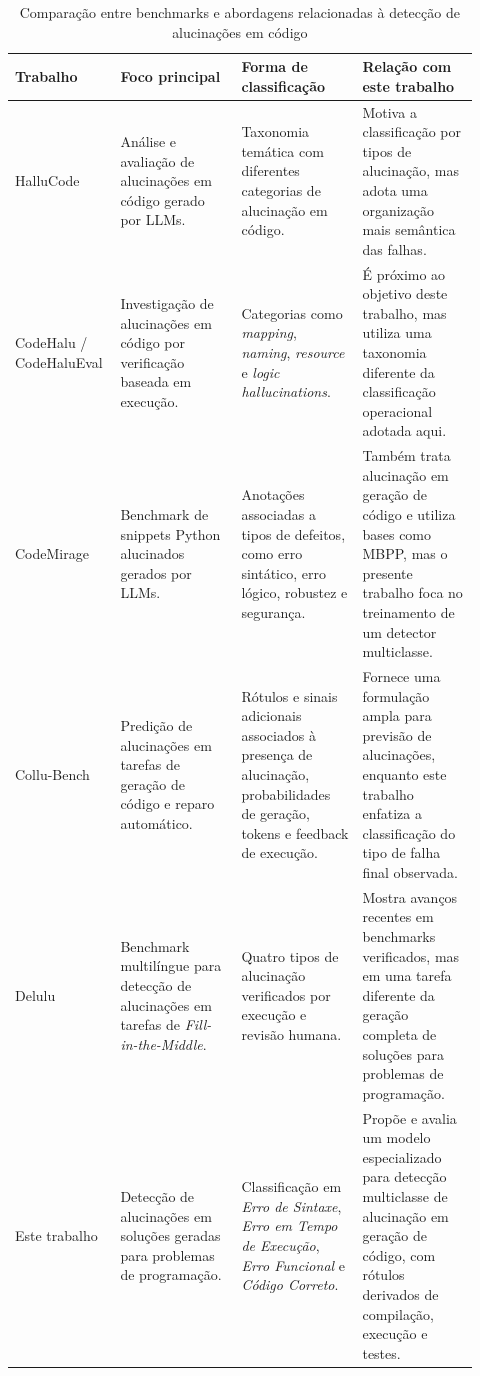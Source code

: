 \documentclass[conference]{IEEEtran}
\begin{document}
\begin{table}[!htbp]
\centering
\caption{Comparação entre benchmarks e abordagens relacionadas à detecção de alucinações em código}
\label{tab:benchmarks-relacionados}

\small
\begin{tabular}{p{0.18\linewidth} p{0.25\linewidth} p{0.25\linewidth} p{0.24\linewidth}}
\toprule
\textbf{Trabalho} & \textbf{Foco principal} & \textbf{Forma de classificação} & \textbf{Relação com este trabalho} \\
\midrule

HalluCode \cite{2404.00971} &
Análise e avaliação de alucinações em código gerado por LLMs. &
Taxonomia temática com diferentes categorias de alucinação em código. &
Motiva a classificação por tipos de alucinação, mas adota uma organização mais semântica das falhas. \\

CodeHalu / CodeHaluEval \cite{2405.00253} &
Investigação de alucinações em código por verificação baseada em execução. &
Categorias como \emph{mapping}, \emph{naming}, \emph{resource} e \emph{logic hallucinations}. &
É próximo ao objetivo deste trabalho, mas utiliza uma taxonomia diferente da classificação operacional adotada aqui. \\

CodeMirage \cite{2408.08333} &
Benchmark de snippets Python alucinados gerados por LLMs. &
Anotações associadas a tipos de defeitos, como erro sintático, erro lógico, robustez e segurança. &
Também trata alucinação em geração de código e utiliza bases como MBPP, mas o presente trabalho foca no treinamento de um detector multiclasse. \\

Collu-Bench \cite{2410.09997} &
Predição de alucinações em tarefas de geração de código e reparo automático. &
Rótulos e sinais adicionais associados à presença de alucinação, probabilidades de geração, tokens e feedback de execução. &
Fornece uma formulação ampla para previsão de alucinações, enquanto este trabalho enfatiza a classificação do tipo de falha final observada. \\

Delulu \cite{2605.07024} &
Benchmark multilíngue para detecção de alucinações em tarefas de \emph{Fill-in-the-Middle}. &
Quatro tipos de alucinação verificados por execução e revisão humana. &
Mostra avanços recentes em benchmarks verificados, mas em uma tarefa diferente da geração completa de soluções para problemas de programação. \\

Este trabalho &
Detecção de alucinações em soluções geradas para problemas de programação. &
Classificação em \emph{Erro de Sintaxe}, \emph{Erro em Tempo de Execução}, \emph{Erro Funcional} e \emph{Código Correto}. &
Propõe e avalia um modelo especializado para detecção multiclasse de alucinação em geração de código, com rótulos derivados de compilação, execução e testes. \\

\bottomrule
\end{tabular}
\end{table}
\end{document}
